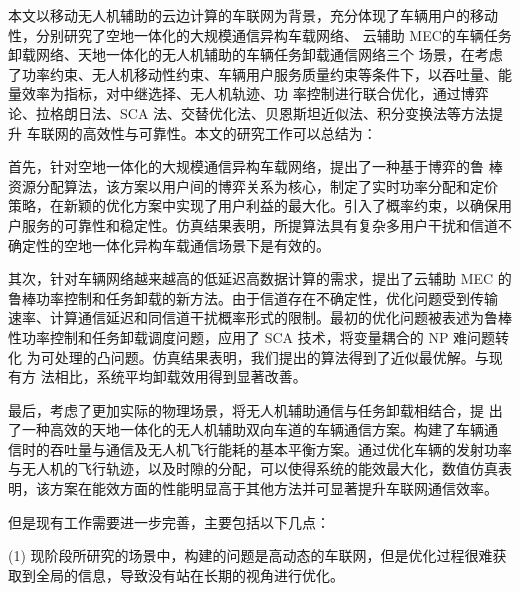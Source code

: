\makeatletter
{}
  \pagestyle{fancy}%
  \fancyhf{}
\makeatother

\begin{conclusion} \label{chap:conclusion}
\textcolor[RGB]{18,20,168}{}本文以移动无人机辅助的云边计算的车联网为背景，充分体现了车辆用户的移动性，分别研究了空地一体化的大规模通信异构车载网络、
云辅助 MEC的车辆任务卸载网络、天地一体化的无人机辅助的车辆任务卸载通信网络三个
场景，在考虑了功率约束、无人机移动性约束、车辆用户服务质量约束等条件下，以吞吐量、能量效率为指标，对中继选择、无人机轨迹、功
率控制进行联合优化，通过博弈论、拉格朗日法、SCA 法、交替优化法、贝恩斯坦近似法、积分变换法等方法提升
车联网的高效性与可靠性。本文的研究工作可以总结为：

首先，针对空地一体化的大规模通信异构车载网络，提出了一种基于博弈的鲁
棒资源分配算法，该方案以用户间的博弈关系为核心，制定了实时功率分配和定价
策略，在新颖的优化方案中实现了用户利益的最大化。引入了概率约束，以确保用
户服务的可靠性和稳定性。仿真结果表明，所提算法具有复杂多用户干扰和信道不
确定性的空地一体化异构车载通信场景下是有效的。

其次，针对车辆网络越来越高的低延迟高数据计算的需求，提出了云辅助 MEC
的鲁棒功率控制和任务卸载的新方法。由于信道存在不确定性，优化问题受到传输
速率、计算通信延迟和同信道干扰概率形式的限制。最初的优化问题被表述为鲁棒
性功率控制和任务卸载调度问题，应用了 SCA 技术，将变量耦合的 NP 难问题转化
为可处理的凸问题。仿真结果表明，我们提出的算法得到了近似最优解。与现有方
法相比，系统平均卸载效用得到显著改善。

最后，考虑了更加实际的物理场景，将无人机辅助通信与任务卸载相结合，提
出了一种高效的天地一体化的无人机辅助双向车道的车辆通信方案。构建了车辆通
信时的吞吐量与通信及无人机飞行能耗的基本平衡方案。通过优化车辆的发射功率
与无人机的飞行轨迹，以及时隙的分配，可以使得系统的能效最大化，数值仿真表
明，该方案在能效方面的性能明显高于其他方法并可显著提升车联网通信效率。

但是现有工作需要进一步完善，主要包括以下几点：

(1) 现阶段所研究的场景中，构建的问题是高动态的车联网，但是优化过程很难获取到全局的信息，导致没有站在长期的视角进行优化。


\end{conclusion}
